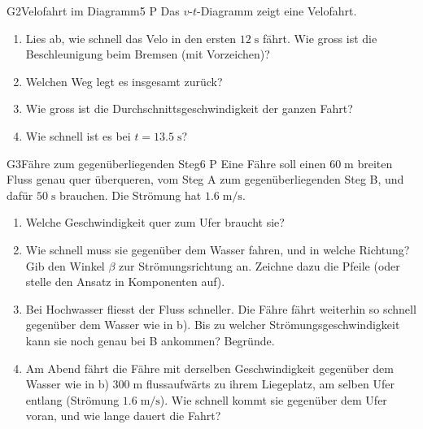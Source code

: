\documentclass[11pt]{article}
\begin{document}
\begin{lpaufgabe}{G2}{Velofahrt im Diagramm}{5 P}
Das $v$-$t$-Diagramm zeigt eine Velofahrt.\par\smallskip
\begin{center}\end{center}
\begin{enumerate}[label=\alph*),leftmargin=*,itemsep=2pt,topsep=2pt]
\item Lies ab, wie schnell das Velo in den ersten $12\;\text{s}$ fährt. Wie gross ist die Beschleunigung beim Bremsen (mit Vorzeichen)?
\item Welchen Weg legt es insgesamt zurück?
\item Wie gross ist die Durchschnittsgeschwindigkeit der ganzen Fahrt?
\item Wie schnell ist es bei $t = 13.5\;\text{s}$?
\end{enumerate}
\end{lpaufgabe}


\begin{lpaufgabe}{G3}{Fähre zum gegenüberliegenden Steg}{6 P}
Eine Fähre soll einen $60\;\text{m}$ breiten Fluss genau quer überqueren, vom Steg A zum gegenüberliegenden Steg B, und dafür $50\;\text{s}$ brauchen.
Die Strömung hat $1.6\;\text{m/s}$.
\begin{enumerate}[label=\alph*),leftmargin=*,itemsep=2pt,topsep=2pt]
\item Welche Geschwindigkeit quer zum Ufer braucht sie?
\item Wie schnell muss sie gegenüber dem Wasser fahren, und in welche Richtung? Gib den Winkel $\beta$ zur Strömungsrichtung an. Zeichne dazu die Pfeile (oder stelle den Ansatz in Komponenten auf).
\item Bei Hochwasser fliesst der Fluss schneller. Die Fähre fährt weiterhin so schnell gegenüber dem Wasser wie in b). Bis zu welcher Strömungsgeschwindigkeit kann sie noch genau bei B ankommen? Begründe.
\item Am Abend fährt die Fähre mit derselben Geschwindigkeit gegenüber dem Wasser wie in b) $300\;\text{m}$ flussaufwärts zu ihrem Liegeplatz, am selben Ufer entlang (Strömung $1.6\;\text{m/s}$). Wie schnell kommt sie gegenüber dem Ufer voran, und wie lange dauert die Fahrt?
\end{enumerate}
\end{lpaufgabe}
\end{document}
